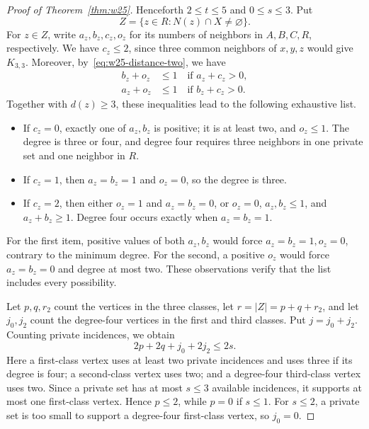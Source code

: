 \documentclass[11pt,a4paper]{article}
\theoremstyle{remark}
\begin{document}
\begin{proof}[Proof of Theorem~\ref{thm:w25}]
Henceforth $2\le t\le5$ and $0\le s\le3$. Put
\[
Z=\{z\in R:N(z)\cap X\ne\varnothing\}.
\]
For $z\in Z$, write $a_z,b_z,c_z,o_z$ for its numbers of neighbors in $A,B,C,R$, respectively. We have $c_z\le2$, since three common neighbors of $x,y,z$ would give $K_{3,3}$. Moreover, by~\eqref{eq:w25-distance-two}, we have
\begin{equation}\label{eq:w25-outside}
\begin{split}
b_z+o_z&\le1\quad\text{if }a_z+c_z>0,\\
a_z+o_z&\le1\quad\text{if }b_z+c_z>0.
\end{split}
\end{equation}
Together with $d(z)\ge3$, these inequalities lead to the following exhaustive list.
\begin{itemize}
\item If $c_z=0$, exactly one of $a_z,b_z$ is positive; it is at least two, and $o_z\le1$. The degree is three or four, and degree four requires three neighbors in one private set and one neighbor in $R$.
\item If $c_z=1$, then $a_z=b_z=1$ and $o_z=0$, so the degree is three.
\item If $c_z=2$, then either $o_z=1$ and $a_z=b_z=0$, or $o_z=0$, $a_z,b_z\le1$, and $a_z+b_z\ge1$. Degree four occurs exactly when $a_z=b_z=1$.
\end{itemize}
For the first item, positive values of both $a_z,b_z$ would force $a_z=b_z=1,o_z=0$, contrary to the minimum degree. For the second, a positive $o_z$ would force $a_z=b_z=0$ and degree at most two. These observations verify that the list includes every possibility.

Let $p,q,r_2$ count the vertices in the three classes, let $r=|Z|=p+q+r_2$, and let $j_0,j_2$ count the degree-four vertices in the first and third classes. Put $j=j_0+j_2$. Counting private incidences, we obtain
\begin{equation}\label{eq:w25-joint}
2p+2q+j_0+2j_2\le2s.
\end{equation}
Here a first-class vertex uses at least two private incidences and uses three if its degree is four; a second-class vertex uses two; and a degree-four third-class vertex uses two. Since a private set has at most $s\le3$ available incidences, it supports at most one first-class vertex. Hence $p\le2$, while $p=0$ if $s\le1$. For $s\le2$, a private set is too small to support a degree-four first-class vertex, so $j_0=0$.


\end{proof}
\end{document}
